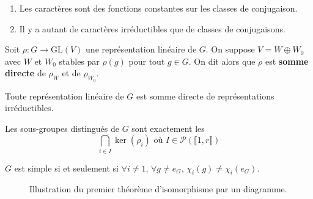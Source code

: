   \begin{proposition}
    \begin{enumerate}[label={\bfseries(\roman*)}]
      \item Les caractères sont des fonctions constantes sur les classes de conjugaison.
      \item Il y a autant de caractères irréductibles que de classes de conjugaisons.
    \end{enumerate}
  \end{proposition}

  \begin{definition}
    Soit $\rho : G \rightarrow \mathrm{GL}(V)$ une représentation linéaire de $G$. On suppose $V = W \oplus W_0$ avec $W$ et $W_0$ stables par $\rho(g)$ pour tout $g \in G$. On dit alors que $\rho$ est \textbf{somme directe} de $\rho_W$ et de $\rho_{W_0}$.
  \end{definition}

  \begin{theorem}
    Toute représentation linéaire de $G$ est somme directe de représentations irréductibles.
  \end{theorem}


  \begin{theorem}
    Les sous-groupes distingués de $G$ sont exactement les
    \[ \bigcap_{i \in I} \ker(\rho_i) \text{ où } I \in \mathcal{P}(\llbracket 1, r \rrbracket) \]
  \end{theorem}

  \begin{corollary}
    $G$ est simple si et seulement si $\forall i \neq 1$, $\forall g \neq e_G$, $\chi_i(g) \neq \chi_i(e_G)$.
  \end{corollary}

  \annexessection


  \begin{figure}[h]
    \begin{center}
    \end{center}
    \caption{Illustration du premier théorème d'isomorphisme par un diagramme.}
  \end{figure}

